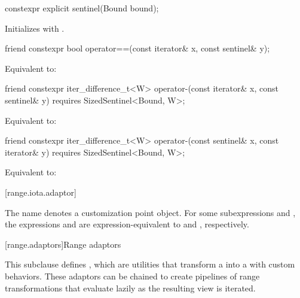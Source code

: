 \begin{itemdecl}
constexpr explicit sentinel(Bound bound);
\end{itemdecl}

\begin{itemdescr}
\pnum
\effects Initializes  with .
\end{itemdescr}

\begin{itemdecl}
friend constexpr bool operator==(const iterator& x, const sentinel& y);
\end{itemdecl}

\begin{itemdescr}
\pnum
\effects Equivalent to: 
\end{itemdescr}

\begin{itemdecl}
friend constexpr iter_difference_t<W> operator-(const iterator& x, const sentinel& y)
  requires SizedSentinel<Bound, W>;
\end{itemdecl}

\begin{itemdescr}
\pnum
\effects Equivalent to: 
\end{itemdescr}

\begin{itemdecl}
friend constexpr iter_difference_t<W> operator-(const sentinel& x, const iterator& y)
  requires SizedSentinel<Bound, W>;
\end{itemdecl}

\begin{itemdescr}
\pnum
\effects Equivalent to: 
\end{itemdescr}

[range.iota.adaptor]{}

\pnum
The name  denotes a
customization point object.
For some subexpressions  and , the expressions
 and 
are expression-equivalent to
 and , respectively.

[range.adaptors]{Range adaptors}

\pnum
This subclause defines , which are utilities that transform a
 into a  with custom behaviors. These
adaptors can be chained to create pipelines of range transformations that
evaluate lazily as the resulting view is iterated.

